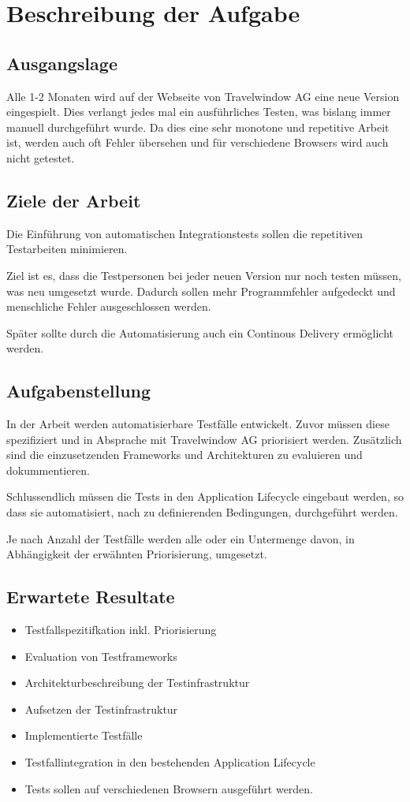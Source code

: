 \chapter{Beschreibung der Aufgabe}

\section{Ausgangslage}
Alle 1-2 Monaten wird auf der Webseite von Travelwindow AG eine neue Version eingespielt. Dies verlangt jedes mal ein ausführliches Testen, was bislang immer manuell durchgeführt wurde. Da dies eine sehr monotone und repetitive Arbeit ist, werden auch oft Fehler übersehen und für verschiedene Browsers wird auch nicht getestet. 

\section{Ziele der Arbeit}
\label{sec:desc:targets}
Die Einführung von automatischen Integrationstests sollen die repetitiven Testarbeiten minimieren.

Ziel ist es, dass die Testpersonen bei jeder neuen Version nur noch testen müssen, was neu umgesetzt wurde.  Dadurch sollen mehr Programmfehler aufgedeckt und menschliche Fehler ausgeschlossen werden.

Später sollte durch die Automatisierung auch ein Continous Delivery ermöglicht werden.

\section{Aufgabenstellung}
In der Arbeit werden automatisierbare Testfälle entwickelt. 
Zuvor müssen diese spezifiziert und in Absprache mit Travelwindow AG priorisiert werden. Zusätzlich sind die einzusetzenden Frameworks und Architekturen zu evaluieren und dokummentieren.

Schlussendlich müssen die Tests in den Application Lifecycle eingebaut werden, so dass sie automatisiert, nach zu definierenden Bedingungen, durchgeführt werden.

Je nach Anzahl der Testfälle werden alle oder ein Untermenge davon, in Abhängigkeit der erwähnten Priorisierung, umgesetzt.

\section{Erwartete Resultate}
\begin{itemize}
\item Testfallspezitifkation inkl. Priorisierung
\item Evaluation von Testframeworks
\item Architekturbeschreibung der Testinfrastruktur
\item Aufsetzen der Testinfrastruktur
\item Implementierte Testfälle
\item Testfallintegration in den bestehenden Application Lifecycle
\item Tests sollen auf verschiedenen Browsern ausgeführt werden.
\end{itemize}